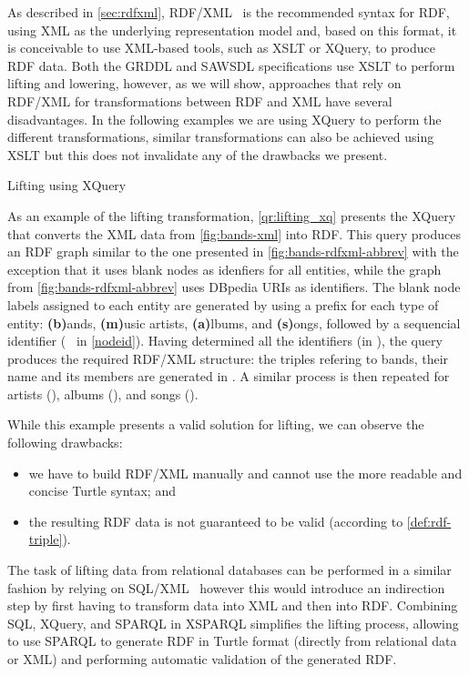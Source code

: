 As described in \cref{sec:rdfxml}, RDF/XML~\cite{BeckettMcBride:2004aa} is the recommended syntax for RDF, using
XML as the underlying representation model and, based on this format, it is conceivable to use \ac{XML}-based tools,
such as \ac{XSLT} or XQuery, to produce \ac{RDF} data.
%
Both the \ac{GRDDL} and \ac{SAWSDL} specifications use \ac{XSLT} to perform lifting and lowering, however, as we will
show, approaches that rely on RDF/XML for transformations between \ac{RDF} and \ac{XML} have several disadvantages.
%
In the following examples we are using XQuery to perform the different transformations, similar transformations can also
be achieved using \ac{XSLT} but this does not invalidate any of the drawbacks we present.
%
\begin{query}[t]
  
  \caption{Lifting using XQuery}
  \label{qr:lifting_xq}
\end{query}
%
\begin{example}
  As an example of the lifting transformation, \cref{qr:lifting_xq} presents the XQuery that converts the \ac{XML}
  data from \cref{fig:bands-xml} into \ac{RDF}.
  This query produces an \ac{RDF} graph similar to the one presented in \cref{fig:bands-rdfxml-abbrev} with the
  exception that it uses blank nodes as idenfiers for all entities, while the graph from \cref{fig:bands-rdfxml-abbrev}
  uses DBpedia \acp{URI} as identifiers.
  The blank node labels assigned to each entity are generated by using a prefix for each type of entity:
  \textbf{(b)}ands, \textbf{(m)}usic artists, \textbf{(a)}lbums, and \textbf{(s)}ongs, followed by a sequencial
  identifier (\cf~ in \cref{nodeid}).
  Having determined all the identifiers (in ), the query produces the required RDF/XML
  structure: the triples refering to bands, their name and its members are generated in
  .
  A similar process is then repeated for artists (), albums
  (), and songs ().
\end{example}
% 
While this example presents a valid solution for lifting, we can observe the following drawbacks:
%
\begin{itemize}[noitemsep]
\item we have to build RDF/XML manually and cannot use the more readable and concise Turtle syntax; and
\item the resulting \ac{RDF} data is not  guaranteed to be valid (according to \cref{def:rdf-triple}).
\end{itemize}
%
The task of lifting data from relational databases can be performed in a similar fashion by relying on
SQL/XML~\cite{EisenbergMelton:2001aa} however this would introduce an indirection step by first having to transform data
into \ac{XML} and then into \ac{RDF}.
%
Combining \ac{SQL}, XQuery, and SPARQL in XSPARQL simplifies the lifting process, allowing to use SPARQL
 to generate \ac{RDF} in Turtle format (directly from relational data or \ac{XML}) and performing
automatic validation of the generated \ac{RDF}.



